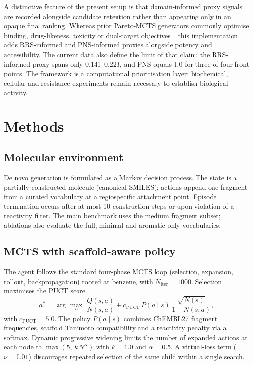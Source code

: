\documentclass[10pt,a4paper]{article}
\begin{document}
A distinctive feature of the present setup is that domain-informed proxy signals are recorded alongside candidate retention rather than appearing only in an opaque final ranking. Whereas prior Pareto-MCTS generators commonly optimise binding, drug-likeness, toxicity or dual-target objectives~\citep{Mothra2024,ParetoDrug2024,CombiMOTS2026}, this implementation adds RRS-informed and PNS-informed proxies alongside potency and accessibility. The current data also define the limit of that claim: the RRS-informed proxy spans only \num{0.141}--\num{0.223}, and PNS equals \num{1.0} for three of four front points. The framework is a computational prioritisation layer; biochemical, cellular and resistance experiments remain necessary to establish biological activity.

\section{Methods}

\subsection{Molecular environment}
\label{sec:env}

De novo generation is formulated as a Markov decision process. The state is a partially constructed molecule (canonical SMILES); actions append one fragment from a curated vocabulary at a regiospecific attachment point. Episode termination occurs after at most \num{10} construction steps or upon violation of a reactivity filter. The main benchmark uses the medium fragment subset; ablations also evaluate the full, minimal and aromatic-only vocabularies.

\subsection{MCTS with scaffold-aware policy}
\label{sec:mcts}

The agent follows the standard four-phase MCTS loop (selection, expansion, rollout, backpropagation) rooted at benzene, with $N_{\text{iter}}=\num{1000}$. Selection maximises the PUCT score
\begin{equation}
  a^{*} = \arg\max_{a}\;
  \frac{Q(s,a)}{N(s,a)}
  + c_{\text{PUCT}}\,P(a\mid s)\,\frac{\sqrt{N(s)}}{1+N(s,a)},
\end{equation}
with $c_{\text{PUCT}}=\num{5.0}$. The policy $P(a\mid s)$ combines ChEMBL27 fragment frequencies, scaffold Tanimoto compatibility and a reactivity penalty via a softmax. Dynamic progressive widening limits the number of expanded actions at each node to $\max(5,\,k\,N^{\alpha})$ with $k=\num{1.0}$ and $\alpha=\num{0.5}$. A virtual-loss term ($\nu=\num{0.01}$) discourages repeated selection of the same child within a single search.
\end{document}
